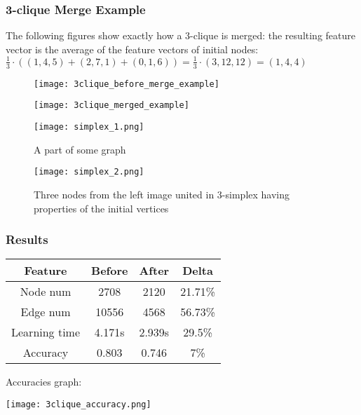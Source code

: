 \begin{frame}[allowframebreaks]
	\frametitle{3-clique Merge Example}

	The following figures show exactly how a 3-clique is merged: the resulting feature vector is the average of the feature vectors of initial nodes: $\frac{1}{3} \cdot \left( (1, 4, 5) + (2, 7, 1) + (0, 1, 6) \right) = \frac{1}{3} \cdot (3, 12, 12) = (1, 4, 4)$

	\begin{figure}[h]
		\begin{minipage}{.7\textwidth}
			\centering
			\texttt{[image: 3clique\_before\_merge\_example]}
		\end{minipage}%
		\begin{minipage}{.3\textwidth}
			\centering
			\texttt{[image: 3clique\_merged\_example]}
		\end{minipage}
	\end{figure}

	\framebreak

	\begin{figure}[h]
		\begin{multicols}{2}
			\centering
			\texttt{[image: simplex\_1.png]}
			\caption{A part of some graph}\label{fig:clique_merged}

			\centering
			\texttt{[image: simplex\_2.png]}
			\caption{Three nodes from the left image united in 3-simplex having properties of the initial vertices}
		\end{multicols}
	\end{figure}
\end{frame}

\begin{frame}[allowframebreaks]
	\frametitle{Results}

	\centering
	\begin{tabular}{ |c|c|c|c| }
		\hline
		Feature       & Before & After  & Delta   \\
		\hline
		Node num      & 2708   & 2120   & 21.71\% \\
		Edge num      & 10556  & 4568   & 56.73\% \\
		Learning time & 4.171s & 2.939s & 29.5\%  \\
		Accuracy      & 0.803  & 0.746  & 7\%     \\
		\hline
	\end{tabular}

	\framebreak

	Accuracies graph:
	\begin{center}
		\texttt{[image: 3clique\_accuracy.png]}
	\end{center}
\end{frame}

